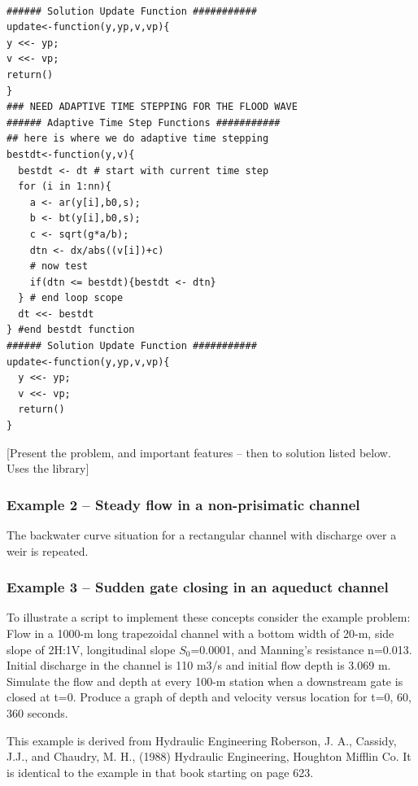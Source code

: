 \begin{lstlisting}[caption=R code demonstrating prototype updating function, label=lst:update-functions]

###### Solution Update Function ###########
update<-function(y,yp,v,vp){
y <<- yp;
v <<- vp;
return()
}
### NEED ADAPTIVE TIME STEPPING FOR THE FLOOD WAVE 
###### Adaptive Time Step Functions ###########
## here is where we do adaptive time stepping
bestdt<-function(y,v){
  bestdt <- dt # start with current time step
  for (i in 1:nn){
    a <- ar(y[i],b0,s);
    b <- bt(y[i],b0,s);
    c <- sqrt(g*a/b);
    dtn <- dx/abs((v[i])+c)
    # now test
    if(dtn <= bestdt){bestdt <- dtn}
  } # end loop scope
  dt <<- bestdt
} #end bestdt function
###### Solution Update Function ###########
update<-function(y,yp,v,vp){
  y <<- yp;
  v <<- vp;
  return()
}
\end{lstlisting}

[Present the problem, and important features -- then to solution listed below.  Uses the library]
\subsubsection{Example 2 -- Steady flow in a non-prisimatic channel}
The backwater curve situation for a rectangular channel with discharge over a weir is repeated.  
\clearpage
\subsubsection{Example 3 -- Sudden gate closing in an aqueduct channel}
To illustrate a script to implement these concepts consider the example problem:\\
Flow in a 1000-m long trapezoidal channel with a bottom width of 20-m, side slope of 2H:1V, longitudinal slope $S_0$=0.0001, and Manning's resistance n=0.013. 
Initial discharge in the channel is 110 m3/s and initial flow depth is 3.069 m.
Simulate the flow and depth at every 100-m station when a downstream gate is closed at t=0. 
Produce a graph of depth and velocity versus location for t=0, 60, 360 seconds.

This example is derived from Hydraulic Engineering Roberson, J. A., Cassidy, J.J., and Chaudry, M. H., (1988) Hydraulic Engineering, Houghton Mifflin Co.
It is identical to the example in that book starting on page 623.


